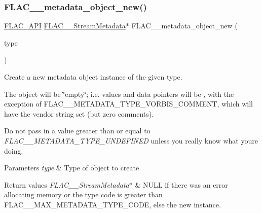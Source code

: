 \subsubsection{\texorpdfstring{F\+L\+A\+C\+\_\+\+\_\+metadata\+\_\+object\+\_\+new()}{FLAC\_\_metadata\_object\_new()}}
{\footnotesize\ttfamily \hyperlink{group__flac__export_ga56ca07df8a23310707732b1c0007d6f5}{F\+L\+A\+C\+\_\+\+A\+PI} \hyperlink{struct_f_l_a_c_____stream_metadata}{F\+L\+A\+C\+\_\+\+\_\+\+Stream\+Metadata}$\ast$ F\+L\+A\+C\+\_\+\+\_\+metadata\+\_\+object\+\_\+new (\begin{DoxyParamCaption}\item[{\hyperlink{group__flac__format_gac71714ba8ddbbd66d26bb78a427fac01}{F\+L\+A\+C\+\_\+\+\_\+\+Metadata\+Type}}]{type }\end{DoxyParamCaption})}

Create a new metadata object instance of the given type.

The object will be \char`\"{}empty\char`\"{}; i.\+e. values and data pointers will be {}, with the exception of F\+L\+A\+C\+\_\+\+\_\+\+M\+E\+T\+A\+D\+A\+T\+A\+\_\+\+T\+Y\+P\+E\+\_\+\+V\+O\+R\+B\+I\+S\+\_\+\+C\+O\+M\+M\+E\+NT, which will have the vendor string set (but zero comments).

Do not pass in a value greater than or equal to {\itshape F\+L\+A\+C\+\_\+\+\_\+\+M\+E\+T\+A\+D\+A\+T\+A\+\_\+\+T\+Y\+P\+E\+\_\+\+U\+N\+D\+E\+F\+I\+N\+ED} unless you really know what you\textquotesingle{}re doing.


\begin{DoxyParams}{Parameters}
{\em type} & Type of object to create \\
\hline
\end{DoxyParams}

\begin{DoxyRetVals}{Return values}
{\em F\+L\+A\+C\+\_\+\+\_\+\+Stream\+Metadata$\ast$} & {\ttfamily N\+U\+LL} if there was an error allocating memory or the type code is greater than F\+L\+A\+C\+\_\+\+\_\+\+M\+A\+X\+\_\+\+M\+E\+T\+A\+D\+A\+T\+A\+\_\+\+T\+Y\+P\+E\+\_\+\+C\+O\+DE, else the new instance. \\
\hline
\end{DoxyRetVals}
\mbox{\label{group__flac__metadata__object_ga2e389272f4df904e1652e79c89ca55c8}} 
